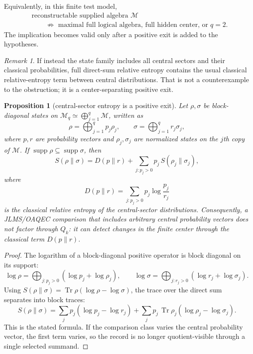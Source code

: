 \documentclass[12pt]{article}
\newtheorem{proposition}{Proposition}
\theoremstyle{remark}
\newtheorem{remark}{Remark}
\newcommand{\M}{\mathcal M}
\newcommand{\Tr}{\operatorname{Tr}}
\newcommand{\supp}{\operatorname{supp}}
\begin{document}
Equivalently, in this finite test model,
\begin{align*}
  &\text{reconstructable supplied algebra } \M \\
  &\qquad\not\Rightarrow
    \text{ maximal full logical algebra, full hidden center, or } q=2 .
\end{align*}
The implication becomes valid only after a positive exit is added to the
hypotheses.

\begin{remark}
If instead the state family includes all central sectors and their classical
probabilities, full direct-sum relative entropy contains the usual classical
relative-entropy term between central distributions.  That is not a
counterexample to the obstruction; it is a center-separating positive exit.
\end{remark}

\begin{proposition}[central-sector entropy is a positive exit]
\label{prop:center-entropy}
Let \(\rho,\sigma\) be block-diagonal states on
\(\M_q\simeq\bigoplus_{j=1}^{q}\M\), written as
\[
  \rho=\bigoplus_{j=1}^{q} p_j\rho_j,\qquad
  \sigma=\bigoplus_{j=1}^{q} r_j\sigma_j,
\]
where \(p,r\) are probability vectors and \(\rho_j,\sigma_j\) are normalized
states on the \(j\)th copy of \(\M\).  If
\(\supp\rho\subseteq\supp\sigma\), then
\[
  S(\rho\|\sigma)
  =
  D(p\|r)+\sum_{j:p_j>0}p_j\,S(\rho_j\|\sigma_j),
\]
where
\[
  D(p\|r)=\sum_{j:p_j>0}p_j\log\frac{p_j}{r_j}
\]
is the classical relative entropy of the central-sector distributions.
Consequently, a JLMS/OAQEC comparison that includes arbitrary central
probability vectors does not factor through \(Q_k\): it can detect changes in
the finite center through the classical term \(D(p\|r)\).
\end{proposition}

\begin{proof}
The logarithm of a block-diagonal positive operator is block diagonal on its
support:
\[
  \log\rho=\bigoplus_{j:p_j>0}(\log p_j+\log\rho_j),
  \qquad
  \log\sigma=\bigoplus_{j:r_j>0}(\log r_j+\log\sigma_j).
\]
Using \(S(\rho\|\sigma)=\Tr \rho(\log\rho-\log\sigma)\), the trace over the
direct sum separates into block traces:
\[
  S(\rho\|\sigma)
  =
  \sum_j p_j(\log p_j-\log r_j)
  +
  \sum_j p_j\,\Tr \rho_j(\log\rho_j-\log\sigma_j).
\]
This is the stated formula.  If the comparison class varies the central
probability vector, the first term varies, so the record is no longer
quotient-visible through a single selected summand.
\end{proof}
\end{document}
